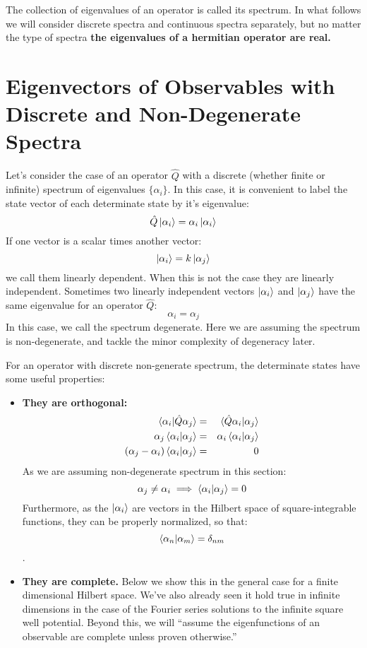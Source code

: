 \documentclass[12pt]{book}
\begin{document}
The collection of eigenvalues of an operator is called its spectrum.  In what follows we will consider discrete spectra and continuous spectra separately, but no matter the type of spectra {\bf the eigenvalues of a hermitian operator are real.}

\section{Eigenvectors of Observables with Discrete and Non-Degenerate Spectra}

Let's consider the case of an operator $\hat{Q}$ with a discrete (whether finite or infinite) spectrum of eigenvalues $\{\alpha_i\}$.  In this case, it is convenient to label the state vector of each determinate state by it's eigenvalue:
$$\hat{Q}\ket{\alpha_i} = \alpha_i \ket{\alpha_i}$$
If one vector is a scalar times another vector:
$$\ket{\alpha_i} = k \ket{\alpha_j}$$
we call them linearly dependent.  When this is not the case they are linearly independent.
Sometimes two linearly independent vectors $\ket{\alpha_i}$ and $\ket{\alpha_j}$ have the same eigenvalue for an operator $\hat{Q}$:
$$\alpha_i = \alpha_j$$
In this case, we call the spectrum degenerate.  Here we are assuming the spectrum is non-degenerate, and tackle the minor complexity of degeneracy later.

For an operator with discrete non-generate spectrum, the determinate states have some useful properties:

\begin{itemize} 
\item {\bf They are orthogonal:}  
\begin{eqnarray*}
\braket{\alpha_i | \hat{Q} \alpha_j} &=& \braket{\hat{Q} \alpha_i | \alpha_j}\\
\alpha_j \braket{\alpha_i | \alpha_j} &=& \alpha_i \braket{\alpha_i | \alpha_j}\\
(\alpha_j-\alpha_i) \braket{\alpha_i | \alpha_j} &=& 0\\
\end{eqnarray*}
As we are assuming non-degenerate spectrum in this section:
$$\alpha_j \neq \alpha_i \implies \braket{\alpha_i | \alpha_j} = 0$$
Furthermore, as the $\ket{\alpha_i}$ are vectors in the Hilbert space of square-integrable functions,
they can be properly normalized, so that:
$$\braket{\alpha_n|\alpha_m} = \delta_{nm}$$.

\item {\bf They are complete.}  Below we show this in the general case for a finite dimensional Hilbert space.  We've also already seen it hold true in infinite dimensions in the case of the Fourier series solutions to the infinite square well potential.  Beyond this, we will ``assume the eigenfunctions of an observable are complete unless proven otherwise.'' 
\end{itemize}
\end{document}
